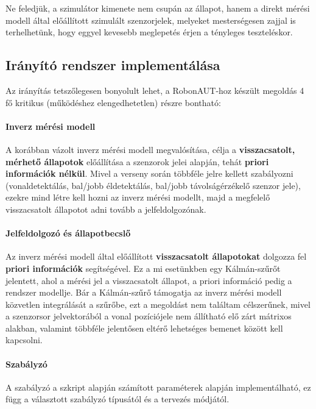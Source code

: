 Ne feledjük, a szimulátor kimenete nem csupán az állapot, hanem a direkt mérési modell által előállított szimulált szenzorjelek, melyeket mesterségesen zajjal is terhelhetünk, hogy eggyel kevesebb meglepetés érjen a tényleges teszteléskor.

\subsection{Irányító rendszer implementálása}

Az irányítás tetszőlegesen bonyolult lehet, a RobonAUT-hoz készült megoldás 4 fő kritikus (működéshez elengedhetetlen) részre bontható:

\paragraph{Inverz mérési modell}

A korábban vázolt inverz mérési modell megvalósítása, célja a \textbf{visszacsatolt, mérhető állapotok} előállítása a szenzorok jelei alapján, tehát \textbf{priori információk nélkül}. Mivel a verseny során többféle jelre kellett szabályozni (vonaldetektálás, bal/jobb éldetektálás, bal/jobb távolságérzékelő szenzor jele), ezekre mind létre kell hozni az inverz mérési modellt, majd a megfelelő visszacsatolt állapotot adni tovább a jelfeldolgozónak.

\paragraph{Jelfeldolgozó és állapotbecslő}

Az inverz mérési modell által előállított \textbf{visszacsatolt állapotokat} dolgozza fel \textbf{priori információk} segítségével. Ez a mi esetünkben egy Kálmán-szűrőt jelentett, ahol a mérési jel a visszacsatolt állapot, a priori információ pedig a rendszer modellje. Bár a Kálmán-szűrő támogatja az inverz mérési modell közvetlen integrálását a szűrőbe, ezt a megoldást nem találtam célszerűnek, mivel a szenzorsor jelvektorából a vonal pozíciójele nem állítható elő zárt mátrixos alakban, valamint többféle jelentősen eltérő lehetséges bemenet között kell kapcsolni.

\paragraph{Szabályzó}

A szabályzó a szkript alapján számított paraméterek alapján implementálható, ez függ a választott szabályzó típusától és a tervezés módjától.

